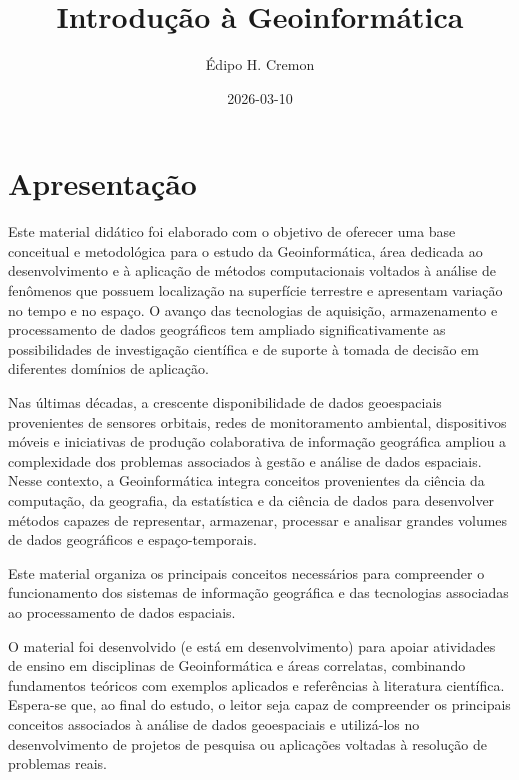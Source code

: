 \documentclass[
  letterpaper,
  DIV=11,
  numbers=noendperiod]{scrreprt}
\title{Introdução à Geoinformática}
\author{Édipo H. Cremon}
\date{2026-03-10}
\renewcommand*\contentsname{Índice}
\newcommand\contentsname{Índice}
\begin{document}
\maketitle

\renewcommand*\contentsname{Índice}
{
\hypersetup{linkcolor=}
\setcounter{tocdepth}{2}
\tableofcontents
}


\chapter{Apresentação}\label{apresentauxe7uxe3o}

Este material didático foi elaborado com o objetivo de oferecer uma base
conceitual e metodológica para o estudo da Geoinformática, área dedicada
ao desenvolvimento e à aplicação de métodos computacionais voltados à
análise de fenômenos que possuem localização na superfície terrestre e
apresentam variação no tempo e no espaço. O avanço das tecnologias de
aquisição, armazenamento e processamento de dados geográficos tem
ampliado significativamente as possibilidades de investigação científica
e de suporte à tomada de decisão em diferentes domínios de aplicação.

Nas últimas décadas, a crescente disponibilidade de dados geoespaciais
provenientes de sensores orbitais, redes de monitoramento ambiental,
dispositivos móveis e iniciativas de produção colaborativa de informação
geográfica ampliou a complexidade dos problemas associados à gestão e
análise de dados espaciais. Nesse contexto, a Geoinformática integra
conceitos provenientes da ciência da computação, da geografia, da
estatística e da ciência de dados para desenvolver métodos capazes de
representar, armazenar, processar e analisar grandes volumes de dados
geográficos e espaço-temporais.

Este material organiza os principais conceitos necessários para
compreender o funcionamento dos sistemas de informação geográfica e das
tecnologias associadas ao processamento de dados espaciais.

O material foi desenvolvido (e está em desenvolvimento) para apoiar
atividades de ensino em disciplinas de Geoinformática e áreas
correlatas, combinando fundamentos teóricos com exemplos aplicados e
referências à literatura científica. Espera-se que, ao final do estudo,
o leitor seja capaz de compreender os principais conceitos associados à
análise de dados geoespaciais e utilizá-los no desenvolvimento de
projetos de pesquisa ou aplicações voltadas à resolução de problemas
reais.
\end{document}

